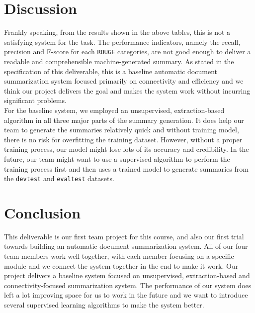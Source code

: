 \documentclass[11pt]{article}
\begin{document}
\section{Discussion}
Frankly speaking, from the results shown in the above tables, this is not a satisfying system for the task. The performance indicators, namely the recall, precision and F-score for each  \texttt{ROUGE} categories, are not good enough to deliver a readable and comprehensible machine-generated summary. As stated in the specification of this deliverable, this is a baseline automatic document summarization system focused primarily on connectivity and efficiency and we think our project delivers the goal and makes the system work without incurring significant problems.\\
\indent
For the baseline system, we employed an unsupervised, extraction-based algorithm in all three major parts of the summary generation. It does help our team to generate the summaries relatively quick and without training model, there is no risk for overfitting the training dataset. However, without a proper training process, our model might lose lots of its accuracy and credibility. In the future, our team might want to use a supervised algorithm to perform the training process first and then uses a trained model to generate summaries from the \texttt{devtest} and \texttt{evaltest} datasets. 

\section{Conclusion}

This deliverable is our first team project for this course, and also our first trial towards building an automatic document summarization system. All of our four team members work well together, with each member focusing on a specific module and we connect the system together in the end to make it work. Our project delivers a baseline system focused on unsupervised, extraction-based and connectivity-focused summarization system. The performance of our system does left a lot improving space for us to work in the future and we want to introduce several supervised learning algorithms to make the system better.
\end{document}
